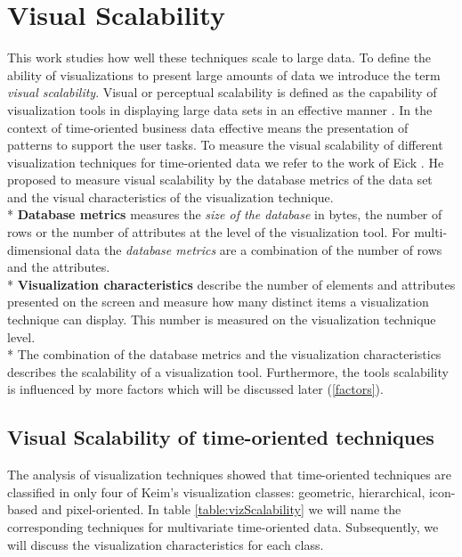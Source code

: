 \chapter{Visual Scalability }
\label{chap:scalability}

This work studies how well these techniques scale to large data. To define the ability of visualizations to present large amounts of data we introduce the term \textit{visual scalability}.
Visual or perceptual scalability is defined as the capability of visualization tools in displaying large data sets in an effective manner  \cite{Eick2002}\label{effective}. In the context of time-oriented business data effective means the presentation of patterns to support the user tasks. To measure the visual scalability of different visualization techniques for time-oriented data we refer to the work of Eick  \cite{Eick2002}. He proposed to measure visual scalability by the database metrics of the data set and the visual characteristics of the visualization technique. \\*
\textbf{Database metrics}\label{databasemetrics} measures the \textit{size of the database} in bytes, the number of rows or the number of attributes at the level of the visualization tool. For multi-dimensional data the \textit{database metrics} are a combination of the number of rows and the attributes. \\*
\textbf{Visualization characteristics} describe the number of elements and attributes presented on the screen and measure how many distinct items a visualization technique can display. This number is measured on the visualization technique level.\\*
The combination of the database metrics and the visualization characteristics describes the scalability of a visualization tool. Furthermore, the tools scalability is influenced by more factors which will be discussed later (\ref{factors}).

\section{Visual Scalability of time-oriented techniques}\label{visualization}
The analysis of visualization techniques showed that time-oriented techniques are classified in only four of Keim's visualization classes: geometric, hierarchical, icon-based and pixel-oriented. In table \ref{table:vizScalability} we will name the corresponding techniques for multivariate time-oriented data. Subsequently, we will discuss the visualization characteristics for each class. 


